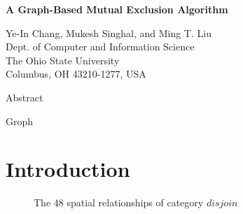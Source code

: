 \voffset -1cm
\hoffset -0.5in
\textheight 8.7in
\textwidth 6.4in
\setlength{\baselineskip}{5ex}
\setlength{\parskip}{0pt}
\setlength{\parindent}{0cm}


\begin{titlepage}
\addtolength{\textwidth}{+.1\textwidth}
\begin{center}
\vspace{2cm}
{\bf
{\LARGE A Graph-Based Mutual Exclusion Algorithm}\\
}

\vspace{2cm}
Ye-In Chang, Mukesh Singhal, and Ming T. Liu\\
Dept. of Computer and Information Science\\
The Ohio State University\\
Columbus, OH 43210-1277, USA

\vspace{2cm}
\end{center}

\begin{center}
{\large Abstract}
\end{center}
\noindent
Groph
\end{titlepage}

\setlength{\baselineskip}{5ex}
\setlength{\parskip}{0pt}
\setlength{\parindent}{0.3cm}
\section{Introduction}

\setlength{\baselineskip}{18pt}
\setlength{\parskip}{10pt}
\setlength{\parindent}{0cm}
\begin{figure}
\caption{The 48 spatial relationships of category $disjoin$}
\label{c1}
\end{figure}


\setlength{\baselineskip}{14pt}
\begin{thebibliography}{99}



\end{thebibliography}

